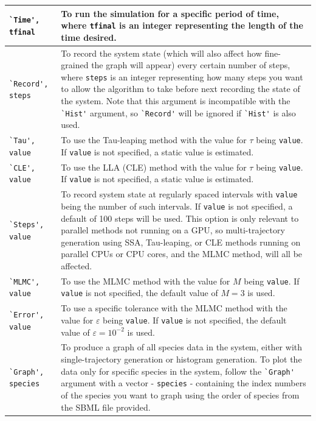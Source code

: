 \documentclass[ugrad,lot,lof,openright,11pt,oneside,onehalfspace]{RUthesis}
\begin{document}
			\begin{longtable}{|p{1.3in}|p{4.2in}|}
			    	\hline
			    		\verb|`Time', tfinal| & To run the simulation for a specific period of time, where \verb|tfinal| is an integer representing the length of the time desired.
			    			\\ \hline
			    		\verb|`Record', steps| & To record the system state (which will also affect how fine-grained the graph will appear) every certain number of steps, where \verb|steps| is an integer representing how many steps you want to allow the algorithm to take before next recording the state of the system. Note that this argument is incompatible with the \verb|`Hist'| argument, so \verb|`Record'| will be ignored if \verb|`Hist'| is also used.
			    			\\ \hline
			    		\verb|`Tau', value| & To use the Tau-leaping method with the value for $\tau$ being \verb|value|. If \verb|value| is not specified, a static value is estimated.
			    			\\ \hline
			    		\verb|`CLE', value| & To use the LLA (CLE) method with the value for $\tau$ being \verb|value|. If \verb|value| is not specified, a static value is estimated.
			    			\\ \hline
			    		\verb|`Steps', value| & To record system state at regularly spaced intervals with \verb|value| being the number of such intervals. If \verb|value| is not specified, a default of 100 steps will be used. This option is only relevant to parallel methods not running on a GPU, so multi-trajectory generation using SSA, Tau-leaping, or CLE methods running on parallel CPUs or CPU cores, and the MLMC method, will all be affected.
			    			\\ \hline
			    		\verb|`MLMC', value| & To use the MLMC method with the value for $M$ being \verb|value|. If \verb|value| is not specified, the default value of $M = 3$ is used.
			    			\\ \hline
			    		\verb|`Error', value| & To use a specific tolerance with the MLMC method with the value for $\varepsilon$ being \verb|value|. If \verb|value| is not specified, the default value of $\varepsilon = 10^{-2}$ is used.
			    			\\ \hline
			    		\verb|`Graph', species| & To produce a graph of all species data in the system, either with single-trajectory generation or histogram generation. To plot the data only for specific species in the system, follow the \verb|`Graph'| argument with a vector - \verb|species| -  containing the index numbers of the species you want to graph using the order of species from the SBML file provided.
			    			\\ \hline
			\end{longtable}
\end{document}
